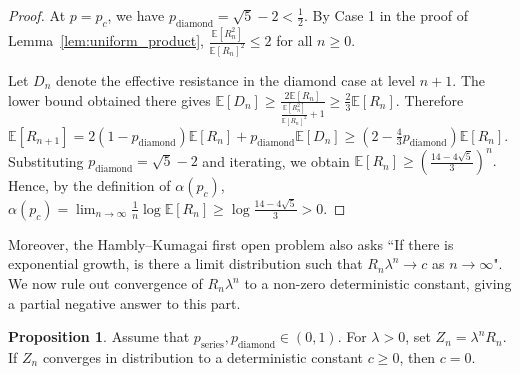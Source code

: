 \documentclass{article}
\theoremstyle{plain}
\theoremstyle{definition}
\newtheorem{proposition}[theorem]{Proposition}
\begin{document}
\begin{proof}
At \(p=p_c\), we have \(p_{\mathrm{diamond}}=\sqrt5-2<\frac{1}{2}\).
By Case 1 in the proof of Lemma~\ref{lem:uniform_product},
$
\frac{\mathbb E[R_n^2]}{\mathbb E[R_n]^2}\le 2
$
for all \(n\ge 0\).

Let \(D_n\) denote the effective resistance in the diamond case at level \(n+1\).
The lower bound obtained there gives
$
\mathbb E[D_n]
\ge
\frac{2\mathbb E[R_n]}{\frac{\mathbb E[R_n^2]}{\mathbb E[R_n]^2}+1}
\ge
\frac{2}{3}\mathbb E[R_n].
$
Therefore
$
\mathbb E[R_{n+1}]
=
2(1-p_{\mathrm{diamond}})\mathbb E[R_n]
+
p_{\mathrm{diamond}}\mathbb E[D_n]
\ge
\left(2-\frac{4}{3}p_{\mathrm{diamond}}\right)\mathbb E[R_n].
$
Substituting \(p_{\mathrm{diamond}}=\sqrt5-2\) and iterating, we obtain
$
\mathbb E[R_n]\ge \left(\frac{14-4\sqrt5}{3}\right)^n.
$
Hence, by the definition of \(\alpha(p_c)\),
$
\displaystyle
\alpha(p_c)
=
\lim_{n\to\infty}\frac{1}{n}\log \mathbb E[R_n]
\ge
\log\frac{14-4\sqrt5}{3}
>
0.
$
\end{proof}





Moreover, the Hambly--Kumagai first open problem also asks ``If there is exponential growth, is there a limit distribution such that $R_n \lambda^n \to c$ as $n \to \infty$".
We now rule out convergence of $R_n \lambda^n$ to a non-zero deterministic constant, giving a partial negative answer to this part.

\begin{proposition}\label{prop:no_deterministic_limit}
Assume that \(p_{\mathrm{series}},p_{\mathrm{diamond}}\in(0,1)\).
For \(\lambda>0\), set \(Z_n=\lambda^n R_n\).
If \(Z_n\) converges in distribution to a deterministic constant \(c\ge 0\), then \(c=0\).
\end{proposition}
\end{document}
